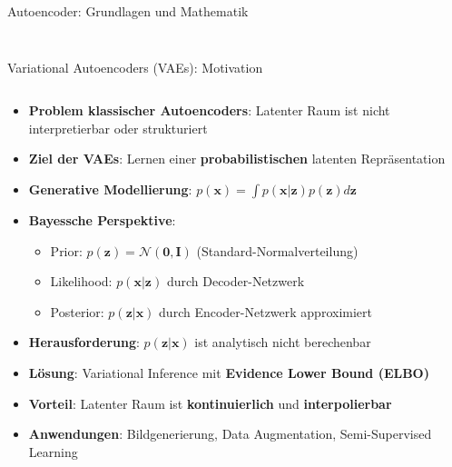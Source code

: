 \documentclass[aspectratio=1610, xcolor=dvipsnames, 9pt]{beamer}
\begin{document}
\begin{frame}{Autoencoder: Grundlagen und Mathematik}
\begin{columns}
\begin{column}{0.4\textwidth}
\begin{figure}
               \end{figure}
            \end{column}
        \end{columns}
      \end{frame}

\begin{frame}{Variational Autoencoders (VAEs): Motivation}
  \begin{columns}
    \begin{column}{1\textwidth}
      \begin{itemize}
        \item \textbf{Problem klassischer Autoencoders}: Latenter Raum ist nicht interpretierbar oder strukturiert
        \item \textbf{Ziel der VAEs}: Lernen einer \textbf{probabilistischen} latenten Repräsentation
        \item \textbf{Generative Modellierung}: $p(\mathbf{x}) = \int p(\mathbf{x}|\mathbf{z}) p(\mathbf{z}) d\mathbf{z}$
        \item \textbf{Bayessche Perspektive}:
        \begin{itemize}
          \item Prior: $p(\mathbf{z}) = \mathcal{N}(\mathbf{0}, \mathbf{I})$ (Standard-Normalverteilung)
          \item Likelihood: $p(\mathbf{x}|\mathbf{z})$ durch Decoder-Netzwerk
          \item Posterior: $p(\mathbf{z}|\mathbf{x})$ durch Encoder-Netzwerk approximiert
        \end{itemize}
        \item \textbf{Herausforderung}: $p(\mathbf{z}|\mathbf{x})$ ist analytisch nicht berechenbar
        \item \textbf{Lösung}: Variational Inference mit \textbf{Evidence Lower Bound (ELBO)}
        \item \textbf{Vorteil}: Latenter Raum ist \textbf{kontinuierlich} und \textbf{interpolierbar}
        \item \textbf{Anwendungen}: Bildgenerierung, Data Augmentation, Semi-Supervised Learning
      \end{itemize}
    \end{column}
  \end{columns}
\end{frame}
\end{document}
